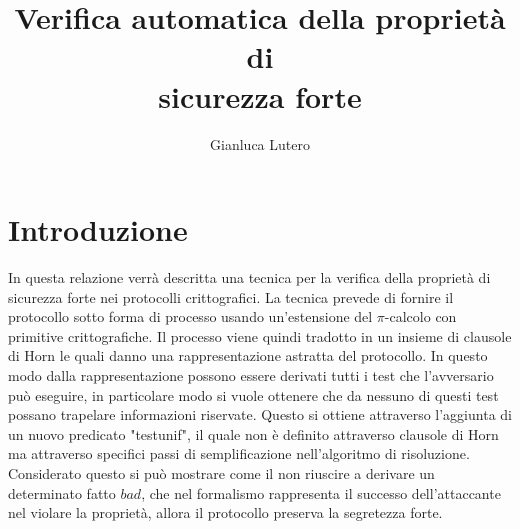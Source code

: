 \documentclass[12pt]{article}
\title{Verifica automatica della proprietà di\\ sicurezza forte}
\author{Gianluca Lutero}
\begin{document}
\maketitle

\newpage
\section*{Introduzione}
In questa relazione verrà descritta una tecnica per la verifica della proprietà di sicurezza forte nei protocolli crittografici. La tecnica prevede di fornire il protocollo sotto forma di processo usando un'estensione del $\pi$-calcolo con primitive crittografiche. Il processo viene quindi tradotto in un insieme di clausole di Horn le quali danno una rappresentazione astratta del protocollo. In questo modo dalla rappresentazione possono essere derivati tutti i test che l'avversario può eseguire, in particolare modo si vuole ottenere che da nessuno di questi test possano trapelare informazioni riservate. Questo si ottiene attraverso l'aggiunta di un nuovo predicato "testunif", il quale non è definito attraverso clausole di Horn ma attraverso specifici passi di semplificazione nell'algoritmo di risoluzione. Considerato questo si può mostrare come il non riuscire a derivare un determinato fatto $bad$, che nel formalismo rappresenta il successo dell'attaccante nel violare la proprietà, allora il protocollo preserva la segretezza forte.  

\newpage
\end{document}
